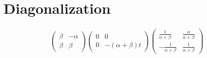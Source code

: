 \documentclass{article}
\providecommand{\Pa}{\alpha}
\providecommand{\Pb}{\beta}
\begin{document}
\section{Diagonalization}

\begin{align}
	\begin{pmatrix}
		\Pb & -\Pa \\
		\Pb & \Pb
	\end{pmatrix}
	\begin{pmatrix}
		0 & 0 \\
		0 & -\left( \Pa + \Pb \right) t
	\end{pmatrix}
	\begin{pmatrix}
		\frac{1}{\Pa + \Pb} & \frac{\Pa}{\Pa + \Pb} \\
		-\frac{1}{\Pa + \Pb} & \frac{1}{\Pa + \Pb}
	\end{pmatrix}
\end{align}
\end{document}
